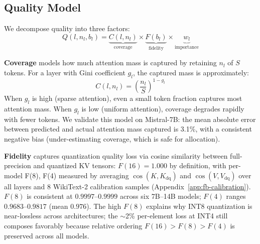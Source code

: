 \documentclass{article}
\begin{document}
\subsection{Quality Model}
\label{sec:quality}

We decompose quality into three factors:
\begin{equation}
Q(l, n_l, b_l) = \underbrace{C(l, n_l)}_{\text{coverage}} \times \underbrace{F(b_l)}_{\text{fidelity}} \times \underbrace{w_l}_{\text{importance}}
\label{eq:quality}
\end{equation}

\textbf{Coverage} models how much attention mass is captured by retaining $n_l$ of $S$ tokens.
For a layer with Gini coefficient $g_l$, the captured mass is approximately:
\begin{equation}
C(l, n_l) = \left(\frac{n_l}{S}\right)^{1 - g_l}
\label{eq:coverage}
\end{equation}
When $g_l$ is high (sparse attention), even a small token fraction captures most attention mass.
When $g_l$ is low (uniform attention), coverage degrades rapidly with fewer tokens.
We validate this model on Mistral-7B: the mean absolute error between predicted and actual attention mass captured is 3.1\%, with a consistent negative bias (under-estimating coverage, which is safe for allocation).

\textbf{Fidelity} captures quantization quality loss via cosine similarity between full-precision and quantized KV tensors:
$F(16) = 1.000$ by definition, with per-model F(8), F(4) measured by averaging $\cos(K, K_{\text{dq}})$ and $\cos(V, V_{\text{dq}})$ over all layers and 8 WikiText-2 calibration samples (Appendix~\ref{app:fb-calibration}).
$F(8)$ is consistent at $0.9997$--$0.9999$ across six 7B--14B models; $F(4)$ ranges $0.9683$--$0.9817$ (mean $0.976$).
The high $F(8)$ explains why INT8 quantization is near-lossless across architectures; the $\sim$2\% per-element loss at INT4 still composes favorably because relative ordering $F(16){>}F(8){>}F(4)$ is preserved across all models.

\end{document}
